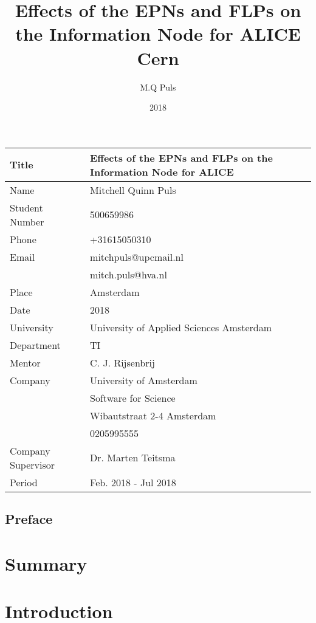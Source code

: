 \documentclass{report}
\title{Effects of the EPNs and FLPs on the Information Node for ALICE\\Cern}
\author{M.Q Puls}
\date{2018}
\begin{document}
\maketitle

\newpage

\begin{tabular}{| l | l |}
\hline
Title & Effects of the EPNs and FLPs on the Information Node for ALICE \\ \hline
Name & Mitchell Quinn Puls \\ \hline
Student Number & 500659986 \\ \hline
Phone & +31615050310 \\ \hline
Email & mitchpuls@upcmail.nl \\ & mitch.puls@hva.nl \\ \hline
Place & Amsterdam \\ \hline
Date & 2018 \\ \hline
University & University of Applied Sciences Amsterdam \\ \hline
Department & TI \\ \hline
Mentor & C. J. Rijsenbrij \\ \hline
Company & University of Amsterdam \\ & Software for Science \\ & Wibautstraat 2-4 Amsterdam \\ & 0205995555 \\ \hline
Company Supervisor & Dr. Marten Teitsma \\ \hline
Period & Feb. 2018 - Jul 2018 \\ 
\hline
\end{tabular}

\newpage

\section*{Preface}

\newpage

\tableofcontents

\newpage

\chapter*{Summary}

\newpage

\chapter{Introduction}
\end{document}

